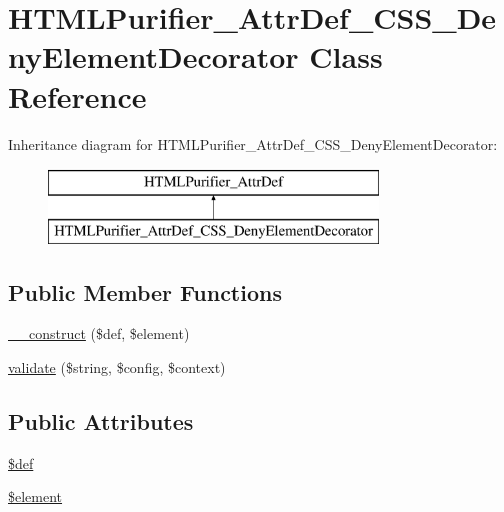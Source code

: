 \hypertarget{classHTMLPurifier__AttrDef__CSS__DenyElementDecorator}{\section{H\+T\+M\+L\+Purifier\+\_\+\+Attr\+Def\+\_\+\+C\+S\+S\+\_\+\+Deny\+Element\+Decorator Class Reference}
\label{classHTMLPurifier__AttrDef__CSS__DenyElementDecorator}
}
Inheritance diagram for H\+T\+M\+L\+Purifier\+\_\+\+Attr\+Def\+\_\+\+C\+S\+S\+\_\+\+Deny\+Element\+Decorator\+:\begin{figure}[H]
\begin{center}
\leavevmode
\includegraphics[height=2.000000cm]{classHTMLPurifier__AttrDef__CSS__DenyElementDecorator}
\end{center}
\end{figure}
\subsection*{Public Member Functions}
\begin{DoxyCompactItemize}
\item 
\hyperlink{classHTMLPurifier__AttrDef__CSS__DenyElementDecorator_a2651e77499d9e26d0b2026ead4f857fb}{\+\_\+\+\_\+construct} (\$def, \$element)
\item 
\hyperlink{classHTMLPurifier__AttrDef__CSS__DenyElementDecorator_a2985a1b17d7ce52fc0baaac4d7723891}{validate} (\$string, \$config, \$context)
\end{DoxyCompactItemize}
\subsection*{Public Attributes}
\begin{DoxyCompactItemize}
\item 
\hyperlink{classHTMLPurifier__AttrDef__CSS__DenyElementDecorator_ac5768a4c2e8de0873fcd2cc5c2b0ab68}{\$def}
\item 
\hyperlink{classHTMLPurifier__AttrDef__CSS__DenyElementDecorator_a83ed8157a77ab74cbe87f6c882f2af2d}{\$element}
\end{DoxyCompactItemize}
